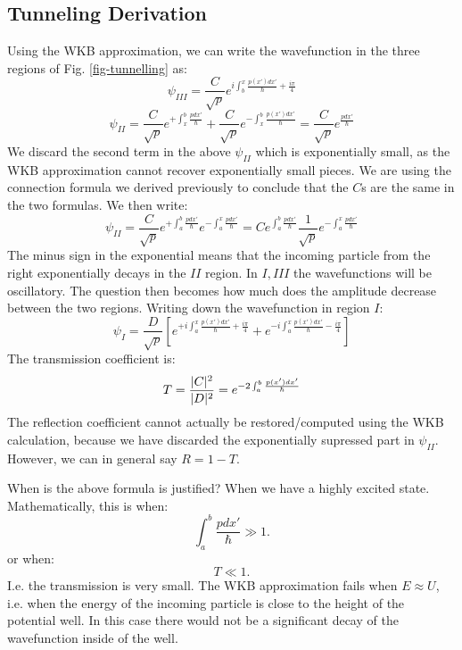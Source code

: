 \subsection{Tunneling Derivation}
Using the WKB approximation, we can write the wavefunction in the three regions of Fig. \ref{fig-tunnelling} as:
\begin{equation}
    \psi_{III} = \frac{C}{\sqrt{p}} e^{i\int_b^x \frac{p(x')dx'}{\hbar} + \frac{i\pi}{4}}
\end{equation}
\begin{equation}
    \psi_{II} = \frac{C}{\sqrt{p}}e^{+\int_x^{b}\frac{pdx'}{\hbar}} + \frac{C}{\sqrt{p}}e^{-\int_x^b \frac{p(x')dx'}{\hbar}} = \frac{C}{\sqrt{p}}e^{\frac{p dx'}{\hbar}}
\end{equation}
We discard the second term in the above $\psi_{II}$ which is exponentially small, as the WKB approximation cannot recover exponentially small pieces. We are using the connection formula we derived previously to conclude that the $C$s are the same in the two formulas. We then write:
\begin{equation}
    \psi_{II} = \frac{C}{\sqrt{p}}e^{+\int_a^b\frac{pdx'}{\hbar}}e^{-\int_a^x \frac{pdx'}{\hbar}} = Ce^{\int_a^b \frac{pdx'}{\hbar}}\frac{1}{\sqrt{p}}e^{-\int_a^x \frac{pdx'}{\hbar}}
\end{equation}
The minus sign in the exponential means that the incoming particle from the right exponentially decays in the $II$ region. In $I, III$ the wavefunctions will be oscillatory. The question then becomes how much does the amplitude decrease between the two regions. Writing down the wavefunction in region $I$:
\begin{equation}
    \psi_I = \frac{D}{\sqrt{p}}\left[e^{+i\int_a^x \frac{p(x')dx'}{\hbar} + \frac{i\pi}{4}} + e^{-i\int_a^x \frac{p(x')dx'}{\hbar} - \frac{i\pi}{4}}\right]
\end{equation}
The transmission coefficient is:
\begin{equation}
    T = \frac{\lvert C \rvert^2}{\lvert D \rvert^2} = e^{-2\int_a^b \frac{p(x')dx'}{\hbar}}
\end{equation}
The reflection coefficient cannot actually be restored/computed using the WKB calculation, because we have discarded the exponentially supressed part in $\psi_{II}$. However, we can in general say $R = 1 - T$. 

When is the above formula is justified? When we have a highly excited state. Mathematically, this is when:
\begin{equation}
    \int_a^b \frac{pdx'}{\hbar} \gg 1.
\end{equation}
or when:
\begin{equation}
    T \ll 1.
\end{equation}
I.e. the transmission is very small. The WKB approximation fails when $E \approx U$, i.e. when the energy of the incoming particle is close to the height of the potential well. In this case there would not be a significant decay of the wavefunction inside of the well.

